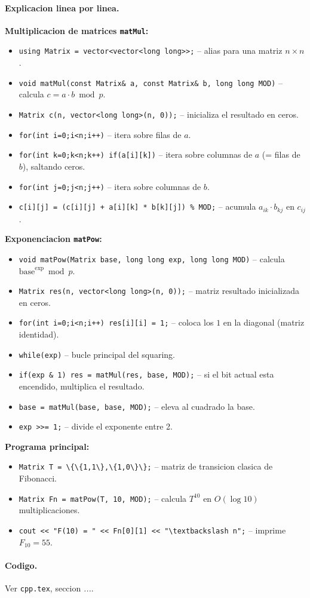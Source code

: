 \paragraph{Explicacion linea por linea.}
\textbf{Multiplicacion de matrices \texttt{matMul}:}
\begin{itemize}\setlength\itemsep{0pt}
	\item \verb|using Matrix = vector<vector<long long>>;| -- alias para una matriz $n \times n$.
	\item \verb|void matMul(const Matrix& a, const Matrix& b, long long MOD)| -- calcula $c = a \cdot b \bmod p$.
	\item \verb|Matrix c(n, vector<long long>(n, 0));| -- inicializa el resultado en ceros.
	\item \verb|for(int i=0;i<n;i++)| -- itera sobre filas de $a$.
	\item \verb|for(int k=0;k<n;k++) if(a[i][k])| -- itera sobre columnas de $a$ (= filas de $b$), saltando ceros.
	\item \verb|for(int j=0;j<n;j++)| -- itera sobre columnas de $b$.
	\item \verb|c[i][j] = (c[i][j] + a[i][k] * b[k][j]) % MOD;| -- acumula $a_{ik} \cdot b_{kj}$ en $c_{ij}$.
\end{itemize}
\textbf{Exponenciacion \texttt{matPow}:}
\begin{itemize}\setlength\itemsep{0pt}
	\item \verb|void matPow(Matrix base, long long exp, long long MOD)| -- calcula $\text{base}^{\text{exp}} \bmod p$.
	\item \verb|Matrix res(n, vector<long long>(n, 0));| -- matriz resultado inicializada en ceros.
	\item \verb|for(int i=0;i<n;i++) res[i][i] = 1;| -- coloca los $1$ en la diagonal (matriz identidad).
	\item \verb|while(exp)| -- bucle principal del squaring.
	\item \verb|if(exp & 1) res = matMul(res, base, MOD);| -- si el bit actual esta encendido, multiplica el resultado.
	\item \verb|base = matMul(base, base, MOD);| -- eleva al cuadrado la base.
	\item \verb|exp >>= 1;| -- divide el exponente entre 2.
\end{itemize}
\textbf{Programa principal:}
\begin{itemize}\setlength\itemsep{0pt}
	\item \verb|Matrix T = \{\{1,1\},\{1,0\}\};| -- matriz de transicion clasica de Fibonacci.
	\item \verb|Matrix Fn = matPow(T, 10, MOD);| -- calcula $T^{10}$ en $O(\log 10)$ multiplicaciones.
	\item \verb|cout << "F(10) = " << Fn[0][1] << "\textbackslash n";| -- imprime $F_{10} = 55$.
\end{itemize}

\paragraph{Codigo.}
Ver \texttt{cpp.tex}, seccion \textit{...}.
